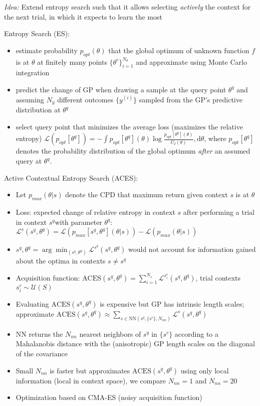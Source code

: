 \begin{block}{}
\emph{Idea:} Extend entropy search such that it allows selecting \emph{actively} the context for the next trial, in which it expects to learn the most

Entropy Search (ES):
\begin{itemize}
 \item estimate probability $p_{opt}(\theta)$ that the global optimum of unknown function $f$ is at $\theta$ at finitely many points $\{\theta^c\}_{i=1}^{N_\theta}$ and approximate using Monte Carlo integration
 \item predict the change of GP when drawing a sample at the query point
$\theta^q$ and assuming $N_y$ different outcomes $\{y^{(i)}\}$ sampled from the
GP's predictive distribution at $\theta^q$
 \item select query point that minimizes the average loss (maximizes the relative entropy) $\mathcal{L}(p_{opt}[\theta^q]) = - \int p_{opt}[\theta^q](\theta) \log \frac{p_{opt}[\theta^q](\theta)}{U_I(\theta)}, \text{d}\theta$,  where $p_{opt}[\theta^q]$ denotes the probability
 distribution of the global optimum \emph{after} an assumed query at $\theta^q$.
\end{itemize}

Active Contextual Entropy Search (ACES):
\begin{itemize}
 \item Let $p_{max}(\theta \vert s)$ denote the CPD that maximum return given context $s$ is at $\theta$
 \item Loss: expected change of relative entropy in context $s$ after performing a trial in context $s^q$with parameter $\theta^q$: $\mathcal{L}^s(s^q, \theta^q) = \mathcal{L}(p_{max}[s^q,\theta^q](\theta \vert s)) - \mathcal{L}(p_{max}(\theta \vert s))$
 \item $s^q, \theta^q = \arg\min_{(s^q, \theta^q)} \mathcal{L}^{s^q}(s^q,
\theta^q)$ would not account for information gained about the
optima in contexts $s \neq s^q$
 \item Acquisition function: $\text{ACES}(s^q, \theta^q) = \sum_{i=1}^{N_s}
\mathcal{L}^{s^c_i}(s^q, \theta^q)$, trial contexts $s^c_i \sim \mathcal{U}(S)$
 \item Evaluating $\text{ACES}(s^q, \theta^q)$ is expensive but GP has intrinsic length scales; \\approximate $\text{ACES}(s^q, \theta^q) \approx \sum_{s \in \text{NN}(s^q,
\{s^c\}, N_{nn})}  \mathcal{L}^s(s^q, \theta^q)$
 \item NN returns the $N_{nn}$ nearest neighbors of  $s^q$ in $\{s^c\}$ according to a Mahalanobis distance with the (anisotropic) GP length scales on the diagonal of the covariance
 \item Small $N_{nn}$ is faster but approximates $\text{ACES}(s^q, \theta^q)$ using only local information (local in context space), we compare $N_{nn}=1$ and $N_{nn}=20$
 \item Optimization based on CMA-ES (noisy acquisition function)
\end{itemize}
\end{block}

\begin{block}{}
\vspace*{1cm}

\end{block}